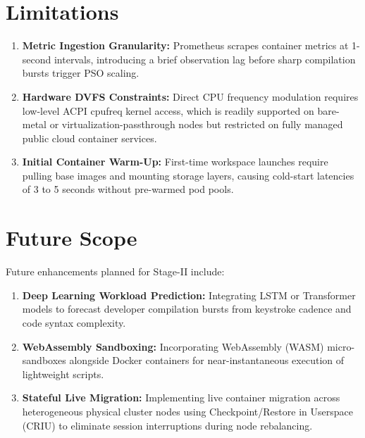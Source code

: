 \documentclass[12pt,a4paper]{report}
\begin{document}
\section{Limitations}
\begin{enumerate}
    \item \textbf{Metric Ingestion Granularity:} Prometheus scrapes container metrics at 1-second intervals, introducing a brief observation lag before sharp compilation bursts trigger PSO scaling.
    \item \textbf{Hardware DVFS Constraints:} Direct CPU frequency modulation requires low-level ACPI cpufreq kernel access, which is readily supported on bare-metal or virtualization-passthrough nodes but restricted on fully managed public cloud container services.
    \item \textbf{Initial Container Warm-Up:} First-time workspace launches require pulling base images and mounting storage layers, causing cold-start latencies of 3 to 5 seconds without pre-warmed pod pools.
\end{enumerate}

\section{Future Scope}
Future enhancements planned for Stage-II include:
\begin{enumerate}
    \item \textbf{Deep Learning Workload Prediction:} Integrating LSTM or Transformer models to forecast developer compilation bursts from keystroke cadence and code syntax complexity.
    \item \textbf{WebAssembly Sandboxing:} Incorporating WebAssembly (WASM) micro-sandboxes alongside Docker containers for near-instantaneous execution of lightweight scripts.
    \item \textbf{Stateful Live Migration:} Implementing live container migration across heterogeneous physical cluster nodes using Checkpoint/Restore in Userspace (CRIU) to eliminate session interruptions during node rebalancing.
\end{enumerate}

\end{document}
